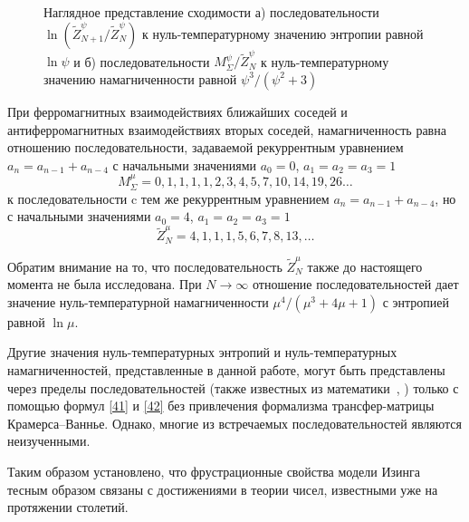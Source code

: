 \begin{figure}[h]
 	\begin{minipage}{0.49\linewidth}
 	\end{minipage}
 	\hfill
 	\begin{minipage}{0.49\linewidth}
 	\end{minipage}
 	\caption{Наглядное представление сходимости а) последовательности $\ln (\widetilde{Z}_{N+1}^{\psi}/\widetilde{Z}_{N}^{\psi})$ к нуль-температурному значению энтропии равной $\ln \psi$ и б) последовательности $M_{\Sigma}^{\psi}/\widetilde{Z}_{N}^{\psi}$ к нуль-температурному значению намагниченности равной $\psi^3/(\psi^2+3)$}
 	\label{fr2}
 \end{figure}

При ферромагнитных взаимодействиях ближайших соседей и антиферромагнитных взаимодействиях вторых соседей, намагниченность равна отношению последовательности, задаваемой рекуррентным уравнением $a_n = a_{n-1} + a_{n-4}$ с начальными значениями $a_0 = 0$, $a_1 = a_2 = a_3 = 1$ \[M^{\mu}_{\Sigma} = 0, 1, 1, 1, 1, 2, 3, 4, 5, 7, 10, 14, 19, 26 \dots\] к последовательности c тем же рекуррентным уравнением $a_n = a_{n-1} + a_{n-4}$, но с начальными значениями $a_0 = 4$, $a_1 = a_2 = a_3 = 1$ \[\widetilde{Z}^{\mu}_{N} = 4, 1, 1, 1, 5, 6, 7, 8, 13, \dots\] 

Обратим внимание на то, что последовательность $\widetilde{Z}^{\mu}_{N}$ также до настоящего момента не была исследована.
При $N\rightarrow \infty$ отношение последовательностей дает значение нуль-температурной намагниченности $\mu^4/(\mu^3+4\mu+1)$ с энтропией равной $\ln \mu$.

Другие значения нуль-температурных энтропий и нуль-температурных намагниченностей, представленные в данной работе, могут быть представлены через пределы последовательностей (также известных из математики~\cite{sloane1973, sloane1995}, \cite{bicknell1975, vieira2020, adams1982}) только с помощью формул \eqref{41} и \eqref{42} без привлечения формализма трансфер-матрицы Крамерса--Ваннье. Однако, многие из встречаемых последовательностей являются неизученными.

Таким образом установлено, что фрустрационные свойства модели Изинга тесным образом связаны с достижениями в теории чисел, известными уже на протяжении столетий.

